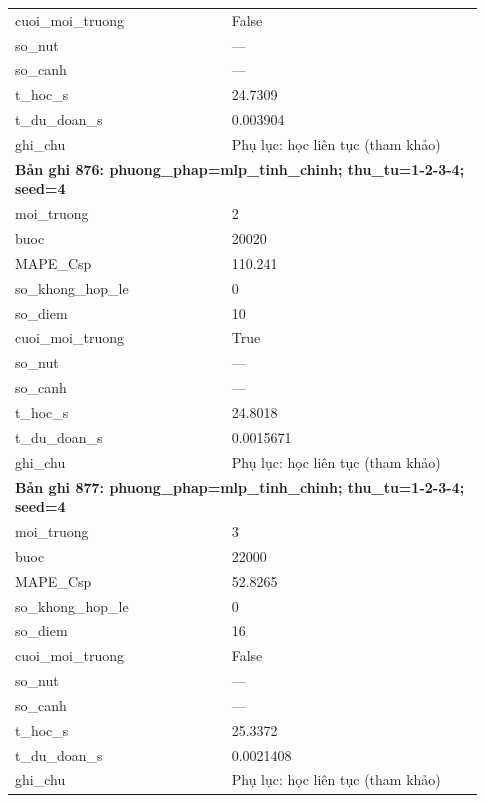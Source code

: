 \begin{longtable}{p{0.43\linewidth}p{0.50\linewidth}}
cuoi\_\allowbreak moi\_\allowbreak truong & False \\
so\_\allowbreak nut & — \\
so\_\allowbreak canh & — \\
t\_\allowbreak hoc\_\allowbreak s & 24.7309 \\
t\_\allowbreak du\_\allowbreak doan\_\allowbreak s & 0.003904 \\
ghi\_\allowbreak chu & Phụ lục: học liên tục (tham khảo) \\
\midrule
\multicolumn{2}{p{0.95\linewidth}}{\textbf{Bản ghi 876: phuong\_phap=mlp\_tinh\_chinh; thu\_tu=1-2-3-4; seed=4}} \\
moi\_\allowbreak truong & 2 \\
buoc & 20020 \\
MAPE\_\allowbreak Csp & 110.241 \\
so\_\allowbreak khong\_\allowbreak hop\_\allowbreak le & 0 \\
so\_\allowbreak diem & 10 \\
cuoi\_\allowbreak moi\_\allowbreak truong & True \\
so\_\allowbreak nut & — \\
so\_\allowbreak canh & — \\
t\_\allowbreak hoc\_\allowbreak s & 24.8018 \\
t\_\allowbreak du\_\allowbreak doan\_\allowbreak s & 0.0015671 \\
ghi\_\allowbreak chu & Phụ lục: học liên tục (tham khảo) \\
\midrule
\multicolumn{2}{p{0.95\linewidth}}{\textbf{Bản ghi 877: phuong\_phap=mlp\_tinh\_chinh; thu\_tu=1-2-3-4; seed=4}} \\
moi\_\allowbreak truong & 3 \\
buoc & 22000 \\
MAPE\_\allowbreak Csp & 52.8265 \\
so\_\allowbreak khong\_\allowbreak hop\_\allowbreak le & 0 \\
so\_\allowbreak diem & 16 \\
cuoi\_\allowbreak moi\_\allowbreak truong & False \\
so\_\allowbreak nut & — \\
so\_\allowbreak canh & — \\
t\_\allowbreak hoc\_\allowbreak s & 25.3372 \\
t\_\allowbreak du\_\allowbreak doan\_\allowbreak s & 0.0021408 \\
ghi\_\allowbreak chu & Phụ lục: học liên tục (tham khảo) \\

\end{longtable}
